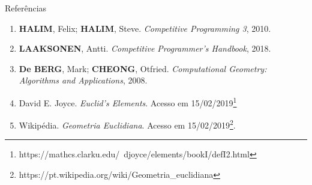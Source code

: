 \begin{frame}[fragile]{Referências}

    \begin{enumerate}
        \item \textbf{HALIM}, Felix; \textbf{HALIM}, Steve. \textit{Competitive Programming 3}, 2010.
        \item \textbf{LAAKSONEN}, Antti. \textit{Competitive Programmer's Handbook}, 2018.

        \item \textbf{De BERG}, Mark; \textbf{CHEONG}, Otfried. \textit{Computational Geometry: Algorithms and Applications}, 2008.

        \item David E. Joyce. \textit{Euclid's Elements}. Acesso em 15/02/2019\footnote{https://mathcs.clarku.edu/~djoyce/elements/bookI/defI2.html}

        \item Wikipédia. \textit{Geometria Euclidiana}. Acesso em 15/02/2019\footnote{https://pt.wikipedia.org/wiki/Geometria\_euclidiana}.

    \end{enumerate}

\end{frame}
